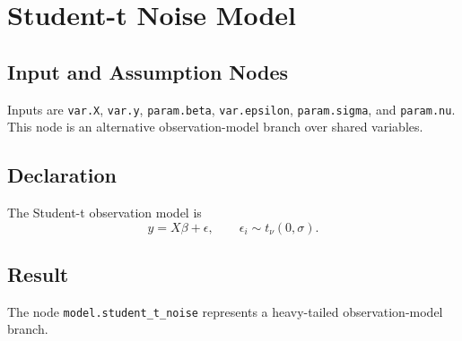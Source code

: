 \section{Student-t Noise Model}
\label{model:student-t-noise}

\subsection{Input and Assumption Nodes}
Inputs are \texttt{var.X}, \texttt{var.y}, \texttt{param.beta}, \texttt{var.epsilon}, \texttt{param.sigma}, and \texttt{param.nu}. This node is an alternative observation-model branch over shared variables.

\subsection{Declaration}
The Student-t observation model is
\[
  y = X\beta + \epsilon,
  \qquad
  \epsilon_i \sim t_\nu(0,\sigma).
\]

\subsection{Result}
The node \texttt{model.student\_t\_noise} represents a heavy-tailed observation-model branch.
